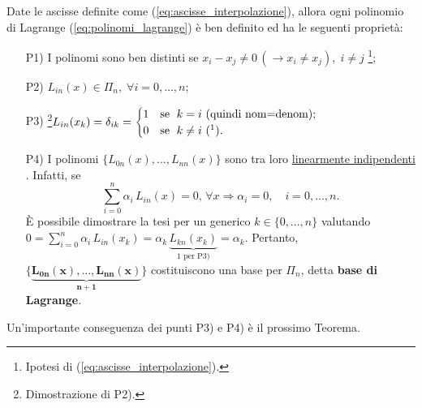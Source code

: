 \begin{property}
	Date le ascisse definite come (\ref{eq:ascisse_interpolazione}), allora ogni polinomio di Lagrange (\ref{eq:polinomi_lagrange}) è \gls{ben definito} ed ha le seguenti proprietà:
	\begin{itemize}
		\item[P1)] I polinomi sono ben distinti se $x_i-x_j\neq 0\,(\rightarrow x_i\neq x_j),\; i\neq j$ \footnote{Ipotesi di (\ref{eq:ascisse_interpolazione}).};
		\item [P2)]\footnotemark $L_{in}(x)\in\Pi_n,\; \forall i=0,\hdots,n$;
		\item[P3)]\footnote{Dimostrazione di P2).}$L_{in}(x_k)=\delta_{ik}=
		\begin{cases}
			1 & \text{se $\;k=i$ (quindi nom=denom);}\\
			0 & \text{se $\;k\neq i$ (\footnotemark).} 
		\end{cases}$
		\item[P4)] I polinomi $\{L_{0n}(x), \hdots, L_{nn}(x)\}$ sono tra loro \uline{linearmente indipendenti} \footnotemark.
		Infatti, se
		\begin{equation*}
			\sum_{i=0}^n \alpha_i\, L_{in}(x)=0, \, \forall x \Longrightarrow \alpha_i=0,\quad i=0,\hdots,n.
		\end{equation*}
		È possibile dimostrare la tesi per un generico $k\in \{0,\hdots,n\}$ valutando $0=\sum_{i=0}^n \alpha_i\, L_{in}(x_k)=\alpha_k\,\underbrace{L_{kn}(x_k)}_{1 \text{ per P3)}}=\alpha_k.$ Pertanto, $\boldsymbol{\{\underbrace{L_{0n}(x), \hdots,L_{nn}(x)}_{n+1}\}}$ costituiscono una base per $\Pi_n$, detta \textbf{base di Lagrange}.
	\end{itemize}
\end{property}

Un'importante conseguenza dei punti P3) e P4) è il prossimo Teorema.

